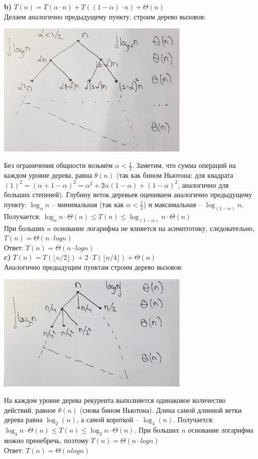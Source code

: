 \documentclass[a4paper,12pt]{article} %
\begin{document}
{\bf b)} $T(n) = T(\alpha \cdot n) + T((1-\alpha)\cdot n) + \Theta(n)$\\
Делаем аналогично предыдущему пункту, строим дерево вызовов: 
\begin{center}
\includegraphics[width=0.7\textwidth]{tree_82}
\end{center}
Без ограничения общности возьмём $ \alpha < \frac{1}{2} $. Заметим, что сумма операций на каждом уровне дерева, равна $ \theta(n) $ (так как бином Ньютона: для квадрата $ (1)^{2}=(\alpha+1-\alpha)^{2}=\alpha^{2}+2 \alpha(1-\alpha)+(1-\alpha)^{2} $, аналогично для больших степеней). Глубину веток деревьев оцениваем аналогично предыдущему пункту: $\log_{\alpha }n $ -- минимальная (так как $ \alpha < \frac{1}{2} $) и максимальная -- $\log_{(1 - \alpha)}n$. \\
Получается: $ \log_{\alpha}n \cdot \Theta(n) \leqslant T(n) \leqslant  \log_{(1 - \alpha)}n \cdot \Theta(n) $\\
При больших $ n $ основание логарифма не влияется на асимптотику, следовательно, $T(n) = \Theta(n \cdot logn)$\\
Ответ: $T(n) = \Theta(n \cdot logn)$\\

{\bf c)} $T(n)=T(\lfloor n/2\rfloor)+2\cdot T(\lfloor n/4\rfloor)+\Theta(n)$	\\
Аналогично предыдущим пунктам строим дерево вызовов: 
\begin{center}
\includegraphics[width=0.7\textwidth]{tree_83}
\end{center}
На каждом уровне дерева рекурента выполняется одинаковое количество действий, равное $ \theta(n) $ (снова бином Ньютона). Длина самой длинной ветки дерева равна $\log_2(n)$, а самой короткой -- $\log_4(n)$. Получается: $\log_{4}n \cdot \Theta(n) \leqslant T(n) \leqslant  \log_{2}n \cdot \Theta(n) $. При больших $ n $ основание логарифма можно пренебречь, поэтому $ T(n) = \Theta(n \cdot logn) $\\
Ответ: $ T(n) = \Theta(nlogn) $
\end{document}
